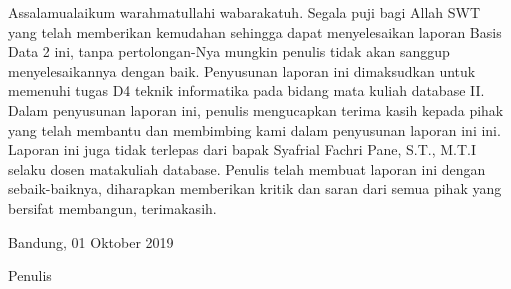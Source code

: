 \begin{acknowledgements}
Assalamualaikum warahmatullahi wabarakatuh. Segala puji bagi Allah SWT yang telah memberikan kemudahan sehingga dapat menyelesaikan laporan Basis Data 2 ini, tanpa pertolongan-Nya mungkin penulis tidak akan sanggup menyelesaikannya dengan baik. Penyusunan laporan ini dimaksudkan untuk memenuhi tugas D4 teknik informatika pada bidang mata kuliah database II. Dalam penyusunan laporan ini, penulis mengucapkan terima kasih kepada pihak yang telah membantu dan membimbing kami dalam penyusunan laporan ini ini. Laporan ini juga tidak terlepas dari bapak Syafrial Fachri Pane, S.T., M.T.I selaku dosen matakuliah database. Penulis telah membuat laporan ini dengan sebaik-baiknya, diharapkan memberikan kritik dan saran dari semua pihak yang bersifat membangun, terimakasih.

\begin{raggedleft}

Bandung, 01 Oktober 2019

Penulis

\end{raggedleft}

\end{acknowledgements}